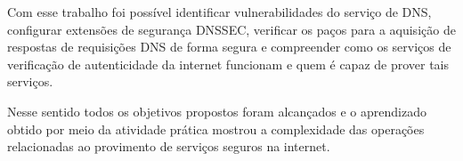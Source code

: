 \documentclass[a4paper]{report} %
\begin{document}
Com esse trabalho foi possível identificar vulnerabilidades do serviço de DNS, configurar extensões de segurança DNSSEC, verificar os paços para a aquisição de respostas de requisições DNS de forma segura e compreender como os serviços de verificação de autenticidade da internet funcionam e quem é capaz de prover tais serviços. 

Nesse sentido todos os objetivos propostos foram alcançados e o aprendizado obtido por meio da atividade prática mostrou a complexidade das operações relacionadas ao provimento de serviços seguros na internet.
\end{document}
